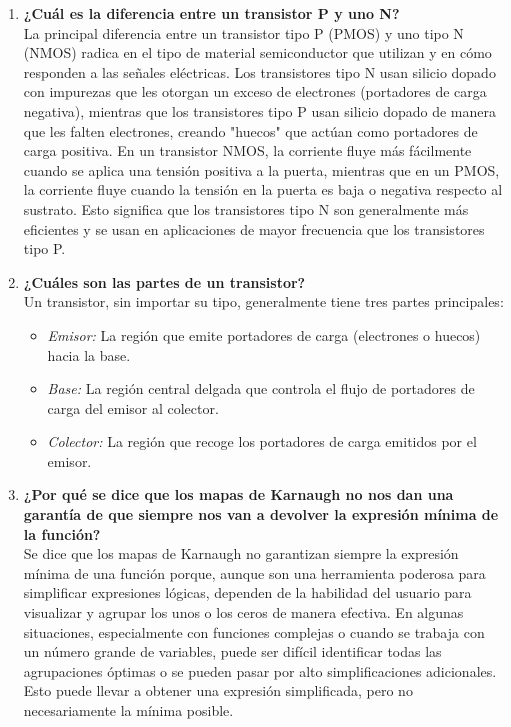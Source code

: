 \documentclass{article}
\begin{document}
\begin{enumerate}
    \item \textbf{¿Cuál es la diferencia entre un transistor P y uno N?} \\
    La principal diferencia entre un transistor tipo P (PMOS) y uno tipo N (NMOS) radica en el tipo de material semiconductor que utilizan y en cómo responden a las señales eléctricas. Los transistores tipo N usan silicio dopado con impurezas que les otorgan un exceso de electrones (portadores de carga negativa), mientras que los transistores tipo P usan silicio dopado de manera que les falten electrones, creando "huecos" que actúan como portadores de carga positiva. En un transistor NMOS, la corriente fluye más fácilmente cuando se aplica una tensión positiva a la puerta, mientras que en un PMOS, la corriente fluye cuando la tensión en la puerta es baja o negativa respecto al sustrato. Esto significa que los transistores tipo N son generalmente más eficientes y se usan en aplicaciones de mayor frecuencia que los transistores tipo P.

    \item \textbf{¿Cuáles son las partes de un transistor?} \\
    Un transistor, sin importar su tipo, generalmente tiene tres partes principales:
    \begin{itemize}
        \item \textit{Emisor:} La región que emite portadores de carga (electrones o huecos) hacia la base.
        \item \textit{Base:} La región central delgada que controla el flujo de portadores de carga del emisor al colector.
        \item \textit{Colector:} La región que recoge los portadores de carga emitidos por el emisor.
    \end{itemize}

    \item \textbf{¿Por qué se dice que los mapas de Karnaugh no nos dan una garantía de que siempre nos van a devolver la expresión mínima de la función?} \\
    Se dice que los mapas de Karnaugh no garantizan siempre la expresión mínima de una función porque, aunque son una herramienta poderosa para simplificar expresiones lógicas, dependen de la habilidad del usuario para visualizar y agrupar los unos o los ceros de manera efectiva. En algunas situaciones, especialmente con funciones complejas o cuando se trabaja con un número grande de variables, puede ser difícil identificar todas las agrupaciones óptimas o se pueden pasar por alto simplificaciones adicionales. Esto puede llevar a obtener una expresión simplificada, pero no necesariamente la mínima posible.


\end{enumerate}
\end{document}
